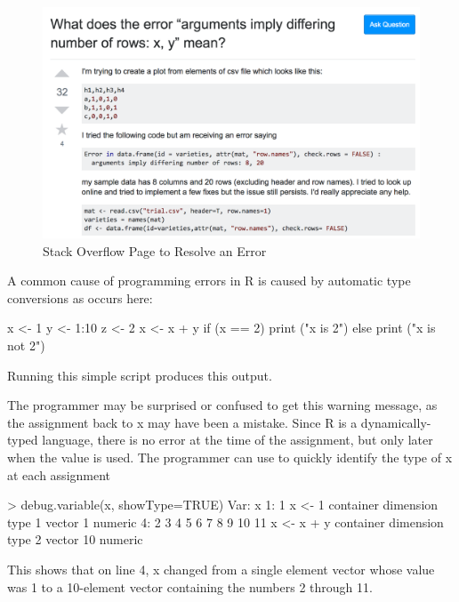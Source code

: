 \begin{figure}[t]
    \centering
    \includegraphics[width=\textwidth]{figures/StackOverflow.png}
    \caption{Stack Overflow Page to Resolve an Error}
   \label{fig:stackoverflow}
\end{figure}

A common cause of programming errors in R is caused by automatic type conversions as occurs here:
\begin{example}
x <- 1
y <- 1:10
z <- 2
x <- x + y
if (x == 2) {
  print ("x is 2")
} else {
  print ("x is not 2")
}
\end{example}
Running this simple script 
produces this output.
\begin{example}
Error in if (x == 2) { : the condition has length > 1
\end{example}

%


The programmer may be surprised or confused to get this warning message, as the assignment back to x may have been a mistake.  Since R is a dynamically-typed language, there is no error at the time of the assignment, but only later when the value is used.  The programmer can use  to quickly identify the type of x at each assignment 
\begin{example}
> debug.variable(x, showType=TRUE)
Var: x 
	1: 	 1 	 x <- 1 
  container dimension type   
1 vector    1         numeric
	4: 	  2  3  4  5  6  7  8  9 10 11 	 x <- x + y 
  container dimension type   
2 vector    10        numeric
\end{example}
This shows that on line 4, x changed from a single element vector whose value was 1 to a 10-element vector containing the numbers 2 through 11.

